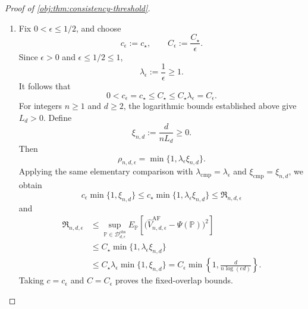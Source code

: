 \documentclass[11pt]{article}
\begin{document}
\begin{proof}[Proof of \cref{obj:thm:consistency-threshold}]
\begin{enumerate}
\item Fix \(0<\epsilon\le1/2\), and choose
\[
c_\epsilon:=c_\star,
\qquad
C_\epsilon:=\frac{C_\star}{\epsilon}.
\]
Since \(\epsilon>0\) and \(\epsilon\le1/2\le1\),
\[
\lambda_\epsilon:=\frac1\epsilon\ge1.
\]
It follows that
\[
0<c_\epsilon=c_\star\le C_\star
\le C_\star\lambda_\epsilon=C_\epsilon.
\]
For integers \(n\ge1\) and \(d\ge2\), the logarithmic bounds established above give \(L_d>0\). Define
\[
\xi_{n,d}:=\frac{d}{nL_d}\ge0.
\]
Then
\[
\rho_{n,d,\epsilon}
=\min\{1,\lambda_\epsilon\xi_{n,d}\}.
\]
Applying the same elementary comparison with
\(\lambda_{\mathrm{cmp}}=\lambda_\epsilon\) and
\(\xi_{\mathrm{cmp}}=\xi_{n,d}\), we obtain
\[
c_\epsilon\min\{1,\xi_{n,d}\}
\le c_\star\min\{1,\lambda_\epsilon\xi_{n,d}\}
\le\mathfrak R_{n,d,\epsilon}
\]
and
\[
\begin{aligned}
\mathfrak R_{n,d,\epsilon}
&\le
\sup_{\mathbb P\in\mathcal D_{d,\epsilon}^{\mathrm{obs}}}
E_{\mathbb P}\!\left[
\bigl(\widehat V_{n,d,\epsilon}^{\mathrm{AF}}-\Psi(\mathbb P)\bigr)^2
\right]\\
&\le C_\star\min\{1,\lambda_\epsilon\xi_{n,d}\}\\
&\le C_\star\lambda_\epsilon\min\{1,\xi_{n,d}\}
=C_\epsilon\min\left\{1,\frac{d}{n\log(ed)}\right\}.
\end{aligned}
\]
Taking \(c=c_\epsilon\) and \(C=C_\epsilon\) proves the fixed-overlap bounds.
\end{enumerate}
\end{proof}
\end{document}
